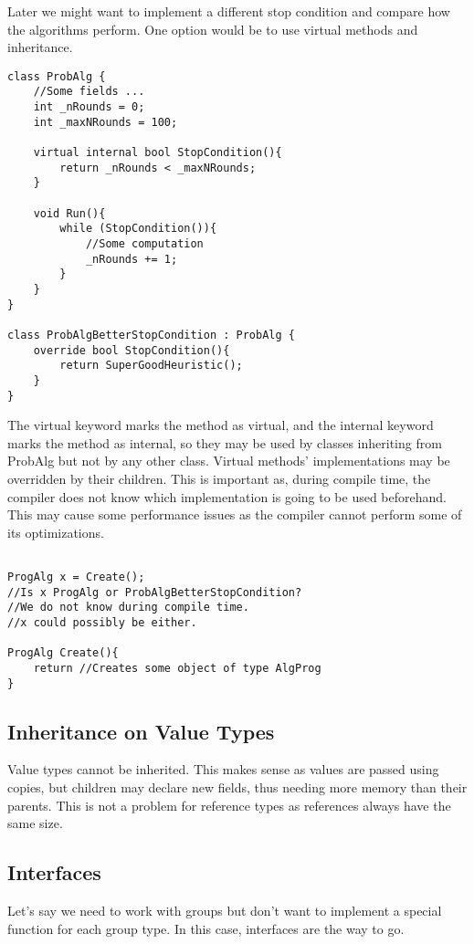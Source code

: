 Later we might want to implement a different stop condition and compare how the algorithms perform. One option would be to use virtual methods and inheritance.

\begin{lstlisting}
class ProbAlg {
    //Some fields ...
    int _nRounds = 0;
    int _maxNRounds = 100;

    virtual internal bool StopCondition(){
        return _nRounds < _maxNRounds;
    }

    void Run(){
        while (StopCondition()){
            //Some computation 
            _nRounds += 1;
        }
    }
}

class ProbAlgBetterStopCondition : ProbAlg {
    override bool StopCondition(){
        return SuperGoodHeuristic();
    }
}
\end{lstlisting}

The virtual keyword marks the method as virtual, and the internal keyword marks the method as internal, so they may be used by classes inheriting from ProbAlg but not by any other class. Virtual methods' implementations may be overridden by their children. This is important as, during compile time, the compiler does not know which implementation is going to be used beforehand. This may cause some performance issues as the compiler cannot perform some of its optimizations.

\begin{lstlisting}

ProgAlg x = Create(); 
//Is x ProgAlg or ProbAlgBetterStopCondition? 
//We do not know during compile time. 
//x could possibly be either.

ProgAlg Create(){
    return //Creates some object of type AlgProg
}
\end{lstlisting}

\subsection{Inheritance on Value Types}
Value types cannot be inherited. This makes sense as values are passed using copies, but children may declare new fields, thus needing more memory than their parents. This is not a problem for reference types as references always have the same size.

\subsection{Interfaces}

Let's say we need to work with groups but don't want to implement a special function for each group type. In this case, interfaces are the way to go.

